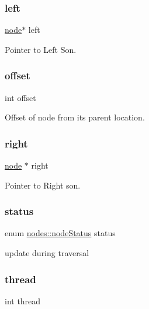 \subsubsection{\texorpdfstring{left}{left}}
{\footnotesize\ttfamily \hyperlink{binary_tree_w_s_8h_aafd781b4673cf2585cd9a156aebd08de}{node}$\ast$ left}



Pointer to Left Son. 

\hypertarget{structnodes_aed7ea92f45bd273dde380a45ddced592}{}\label{structnodes_aed7ea92f45bd273dde380a45ddced592} 
\subsubsection{\texorpdfstring{offset}{offset}}
{\footnotesize\ttfamily int offset}



Offset of node from it\textquotesingle{}s parent location. 

\hypertarget{structnodes_ae274df3c21d52825564b9811fa84f71b}{}\label{structnodes_ae274df3c21d52825564b9811fa84f71b} 
\subsubsection{\texorpdfstring{right}{right}}
{\footnotesize\ttfamily \hyperlink{binary_tree_w_s_8h_aafd781b4673cf2585cd9a156aebd08de}{node} $\ast$ right}



Pointer to Right son. 

\hypertarget{structnodes_ac29e9133b53697ff2478fe001f7d7c74}{}\label{structnodes_ac29e9133b53697ff2478fe001f7d7c74} 
\subsubsection{\texorpdfstring{status}{status}}
{\footnotesize\ttfamily enum \hyperlink{structnodes_aab296cc56fa34a05b7d9d632a9ddef2a}{nodes\+::node\+Status}
     status}

update during traversal \hypertarget{structnodes_a9b61df5d32336fad4da524d04a01b329}{}\label{structnodes_a9b61df5d32336fad4da524d04a01b329} 
\subsubsection{\texorpdfstring{thread}{thread}}
{\footnotesize\ttfamily int thread}



